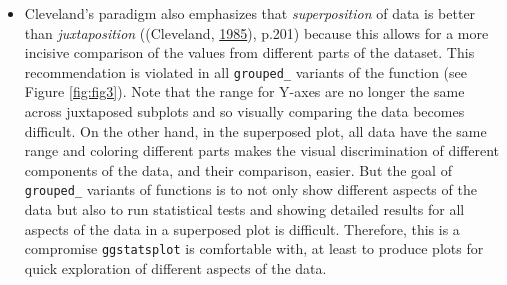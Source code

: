 \documentclass[]{article}
\providecommand{\tightlist}{%
  \setlength{\itemsep}{0pt}\setlength{\parskip}{0pt}}
\begin{document}
\begin{itemize}
\tightlist
\item
  Cleveland's paradigm also emphasizes that \emph{superposition} of data is better
  than \emph{juxtaposition} ((Cleveland, \protect\hyperlink{ref-clevelandElementsGraphingData1985}{1985}), p.201) because
  this allows for a more incisive comparison of the values from different
  parts of the dataset. This recommendation is violated in all \texttt{grouped\_}
  variants of the function (see Figure \ref{fig:fig3}). Note that the range
  for Y-axes are no longer the same across juxtaposed subplots and so visually
  comparing the data becomes difficult. On the other hand, in the superposed
  plot, all data have the same range and coloring different parts makes the
  visual discrimination of different components of the data, and their
  comparison, easier. But the goal of \texttt{grouped\_} variants of functions is to
  not only show different aspects of the data but also to run statistical
  tests and showing detailed results for all aspects of the data in a
  superposed plot is difficult. Therefore, this is a compromise \texttt{ggstatsplot}
  is comfortable with, at least to produce plots for quick exploration of
  different aspects of the data.
\end{itemize}
\end{document}
